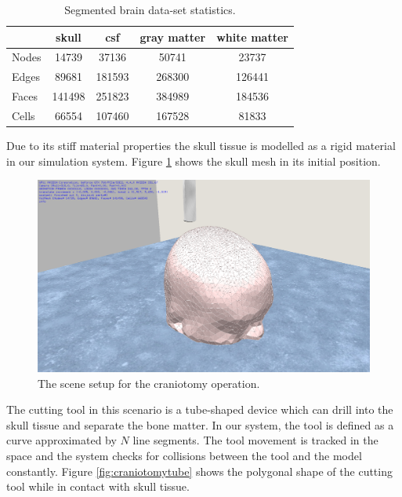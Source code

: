 \begin{table}[H]
\begin{center}
\caption{\label{table:brainmesh}{Segmented brain data-set statistics.}}
  \begin{tabular}{ | l | c | c | c | c |}
    \hline    
     & skull & csf & gray matter & white matter \\ \hline \hline    
    Nodes & 14739 & 37136 & 50741 & 23737  \\ \hline
    Edges & 89681 & 181593 & 268300 & 126441 \\ \hline
    Faces & 141498 & 251823 & 384989 & 184536 \\ \hline
    Cells & 66554 & 107460 & 167528 & 81833 \\ \hline
    \hline
  \end{tabular}
\end{center}
\end{table}

Due to its stiff material properties the skull tissue is modelled as a rigid material in our simulation system. 
Figure \ref{fig:craniotomy01} shows the skull mesh in its initial position.

\begin{figure}[H]
  \centering
  \includegraphics[width=0.7\linewidth]{figures/evaluation/craniotomy01.png}
  \caption{\label{fig:craniotomy01}
  {The scene setup for the craniotomy operation.}
}
\end{figure}


The cutting tool in this scenario is a tube-shaped device which can drill into the skull tissue and separate the bone matter.
In our system, the tool is defined as a curve approximated by $N$ line segments. The tool movement is tracked in the space 
and the system checks for collisions between the tool and the model constantly. Figure \ref{fig:craniotomytube} shows the 
polygonal shape of the cutting tool while in contact with skull tissue.


